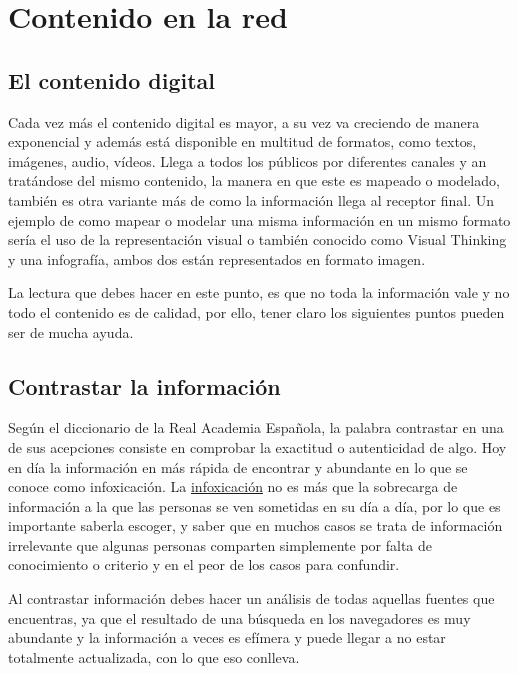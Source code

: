 \documentclass[
  a4paper,
  openany]{book}
\begin{document}
\hypertarget{contenido-en-la-red}{%
\chapter{Contenido en la red}\label{contenido-en-la-red}}

\hypertarget{el-contenido-digital}{%
\section{El contenido digital}\label{el-contenido-digital}}

Cada vez más el contenido digital es mayor, a su vez va creciendo de manera exponencial y además está disponible en multitud de formatos, como textos, imágenes, audio, vídeos. Llega a todos los públicos por diferentes canales y an tratándose del mismo contenido, la manera en que este es mapeado o modelado, también es otra variante más de como la información llega al receptor final. Un ejemplo de como mapear o modelar una misma información en un mismo formato sería el uso de la representación visual o también conocido como Visual Thinking y una infografía, ambos dos están representados en formato imagen.

La lectura que debes hacer en este punto, es que no toda la información vale y no todo el contenido es de calidad, por ello, tener claro los siguientes puntos pueden ser de mucha ayuda.

\hypertarget{contrastar-la-informaciuxf3n}{%
\section{Contrastar la información}\label{contrastar-la-informaciuxf3n}}

Según el diccionario de la Real Academia Española, la palabra contrastar en una de sus acepciones consiste en comprobar la exactitud o autenticidad de algo. Hoy en día la información en más rápida de encontrar y abundante en lo que se conoce como infoxicación. La \href{https://es.godaddy.com/blog/infoxicacion-causas-consecuencias/}{infoxicación} no es más que la sobrecarga de información a la que las personas se ven sometidas en su día a día, por lo que es importante saberla escoger, y saber que en muchos casos se trata de información irrelevante que algunas personas comparten simplemente por falta de conocimiento o criterio y en el peor de los casos para confundir.

Al contrastar información debes hacer un análisis de todas aquellas fuentes que encuentras, ya que el resultado de una búsqueda en los navegadores es muy abundante y la información a veces es efímera y puede llegar a no estar totalmente actualizada, con lo que eso conlleva.
\end{document}
